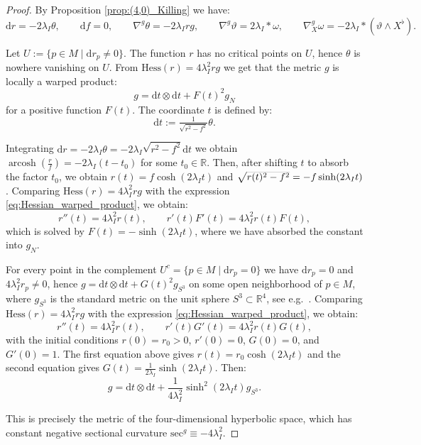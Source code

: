 \documentclass[10pt,a4paper,twoside,reqno]{amsart}
\theoremstyle{plain}
\theoremstyle{definition}
\theoremstyle{remark}
\def\R{\mathbb{R}}
\def\dd{\mathrm{d}}
\def\R{\mathbb{R}}
\def\dd{\mathrm{d}}
\def\Hess{\mathrm{Hess}}
\begin{document}
\begin{proof}
    By Proposition \ref{prop:(4,0)_Killing} we have: $$\dd r=-2\lambda_I\theta,\qquad \dd f=0,\qquad \nabla^g\theta=-2\lambda_Irg,\qquad \nabla^g\vartheta=2\lambda_I*\omega,\qquad \nabla^g_X\omega=-2\lambda_I*(\vartheta\wedge X^\flat).$$
    
    Let $U:=\{p\in M\mid\dd r_p\neq0\}$. The function $r$ has no critical points on $U$, hence $\theta$ is nowhere vanishing on $U$. From $\Hess(r)=4\lambda_I^2rg$ we get that the metric $g$ is locally a warped product: $$g=\dd t\otimes\dd t+F(t)^2g_N$$ for a positive function $F(t)$. The coordinate $t$ is defined by: $$\dd t:=\tfrac{1}{\sqrt{r^2-f^2}}\theta.$$
    
    Integrating $\dd r=-2\lambda_I\theta=-2\lambda_I\sqrt{r^2-f^2}\dd t$ we obtain $\operatorname{arcosh}(\frac{r}{f})=-2\lambda_I(t-t_0)$ for some $t_0\in\R$. Then, after shifting $t$ to absorb the factor $t_0$, we obtain $r(t)=f\cosh(2\lambda_It)$ and $\smash{\sqrt{r(t)^2-f^2}}=-f\sinh(2\lambda_It)$. Comparing $\Hess(r)=4\lambda_I^2rg$ with the expression \eqref{eq:Hessian_warped_product}, we obtain: $$r''(t)=4\lambda_I^2r(t),\qquad r'(t)F'(t)=4\lambda_I^2r(t)F(t),$$ which is solved by $F(t)=-\sinh(2\lambda_It)$, where we have absorbed the constant into $g_N$.\medskip

    For every point in the complement $U^c=\{p\in M\mid\dd r_p=0\}$ we have $\dd r_p=0$ and $4\lambda_I^2r_p\neq0$, hence $g=\dd t\otimes\dd t+G(t)^2g_{S^3}$ on some open neighborhood of $p\in M$, where $g_{S^3}$ is the standard metric on the unit sphere $S^3\subset\R^4$, see e.g.\ \cite[Thm.\ 4.3.3]{Petersen2016}. Comparing $\Hess(r)=4\lambda_I^2rg$ with the expression \eqref{eq:Hessian_warped_product}, we obtain: $$r''(t)=4\lambda_I^2r(t),\qquad r'(t)G'(t)=4\lambda_I^2r(t)G(t),$$ with the initial conditions $r(0)=r_0>0$, $r'(0)=0$, $G(0)=0$, and $G'(0)=1$. The first equation above gives $r(t)=r_0\cosh(2\lambda_It)$ and the second equation gives $G(t)=\frac{1}{2\lambda_I}\sinh(2\lambda_It)$. Then: $$g=\dd t\otimes\dd t+\frac{1}{4\lambda_I^2}\sinh^2(2\lambda_It)g_{S^3}.$$
    
    This is precisely the metric of the four-dimensional hyperbolic space, which has constant negative sectional curvature $\mathrm{sec}^g\equiv-4\lambda_I^2$.
\end{proof}

\end{document}
